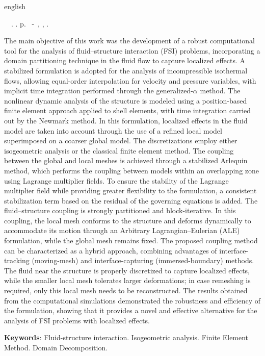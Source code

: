 \begin{resumo}[Abstract]
 \begin{otherlanguage*}{english}
	\begin{flushleft} 
		\setlength{\absparsep}{0pt} %
 		\SingleSpacing  		\imprimirautorabr~~\textbf{\imprimirtitleabstract}.	\imprimirdata.  \pageref{LastPage} p. 
		\imprimirtipotrabalhoabs~-~\imprimirinstituicao, \imprimirlocal, 	\imprimirdata. 
 	\end{flushleft}
	\OnehalfSpacing 
   		The main objective of this work was the development of a robust computational tool for the analysis of fluid–structure interaction (FSI) problems, incorporating a domain partitioning technique in the fluid flow to capture localized effects.
   A stabilized formulation is adopted for the analysis of incompressible isothermal flows, allowing equal-order interpolation for velocity and pressure variables, with implicit time integration performed through the generalized-$\alpha$ method. The nonlinear dynamic analysis of the structure is modeled using a position-based finite element approach applied to shell elements, with time integration carried out by the Newmark method.
   In this formulation, localized effects in the fluid model are taken into account through the use of a refined local model superimposed on a coarser global model. The discretizations employ either isogeometric analysis or the classical finite element method. The coupling between the global and local meshes is achieved through a stabilized Arlequin method, which performs the coupling between models within an overlapping zone using Lagrange multiplier fields. To ensure the stability of the Lagrange multiplier field while providing greater flexibility to the formulation, a consistent stabilization term based on the residual of the governing equations is added.
   The fluid–structure coupling is strongly partitioned and block-iterative. In this coupling, the local mesh conforms to the structure and deforms dynamically to accommodate its motion through an Arbitrary Lagrangian–Eulerian (ALE) formulation, while the global mesh remains fixed. The proposed coupling method can be characterized as a hybrid approach, combining advantages of interface-tracking (moving-mesh) and interface-capturing (immersed-boundary) methods. The fluid near the structure is properly discretized to capture localized effects, while the smaller local mesh tolerates larger deformations; in case remeshing is required, only this local mesh needs to be reconstructed.
   The results obtained from the computational simulations demonstrated the robustness and efficiency of the formulation, showing that it provides a novel and effective alternative for the analysis of FSI problems with localized effects.

   \vspace{\onelineskip}
 
   \noindent 
   \textbf{Keywords}: Fluid-structure interaction. Isogeometric analysis. Finite Element Method. Domain Decomposition. 
 \end{otherlanguage*}
\end{resumo}
